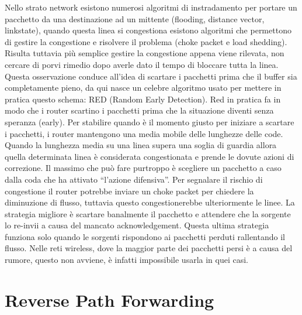 Nello strato network esistono numerosi algoritmi di instradamento per portare un pacchetto da una destinazione ad un mittente (flooding, distance vector, linkstate), quando questa linea si congestiona esistono algoritmi che permettono di gestire la congestione e risolvere il problema (choke packet e load shedding). Risulta tuttavia più semplice gestire la congestione appena viene rilevata, non cercare di porvi rimedio dopo averle dato il tempo di bloccare tutta la linea.
Questa osservazione conduce all’idea di scartare i pacchetti prima che il buffer sia completamente pieno, da qui nasce un celebre algoritmo usato per mettere in pratica questo schema: RED (Random Early Detection).
Red in pratica fa in modo che i router scartino i pacchetti prima che la situazione diventi senza speranza (early). Per stabilire quando è il momento giusto per iniziare a scartare i pacchetti, i router mantengono una media mobile delle lunghezze delle code. Quando la lunghezza media su una linea supera una soglia di guardia allora quella determinata linea è considerata congestionata e prende le dovute azioni di correzione. Il massimo che può fare purtroppo è scegliere un pacchetto a caso dalla coda che ha attivato “l’azione difensiva”. Per segnalare il rischio di congestione il router potrebbe inviare un choke packet per chiedere la diminuzione di flusso, tuttavia questo congestionerebbe ulteriormente le linee. La strategia migliore è scartare banalmente il pacchetto e attendere che la sorgente lo re-invii a causa del mancato acknowledgement. Questa ultima strategia funziona solo quando le sorgenti rispondono ai pacchetti perduti rallentando il flusso. Nelle reti wireless, dove la maggior parte dei pacchetti persi è a causa del rumore, questo non avviene, è infatti impossibile usarla in quei casi.

\section{Reverse Path Forwarding}

